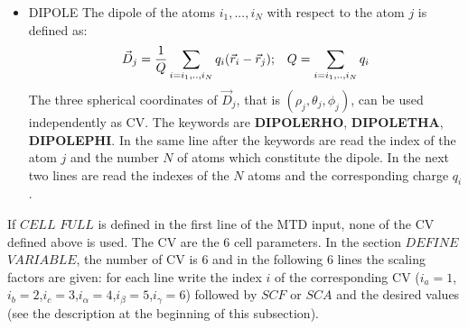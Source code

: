 \documentclass[twoside,10pt,titlepage,a4paper]{article}
\begin{document}
\begin{itemize}
\item{DIPOLE}
The dipole of the atoms $i_1,...,i_N$ with respect to the atom $j$ is defined as:
\begin{eqnarray}
\vec D_j={1\over Q}\sum_{i=i_1,..,i_N}q_i(\vec r_i -\vec r_j);\;\;\; Q=\sum_{i=i_1,..,i_N} q_i
\end{eqnarray}
The three spherical coordinates of $\vec D_j $, that is $(\rho_j,\theta_j,\phi_j)$, can be used
independently as CV. The keywords are {\bf DIPOLERHO}, {\bf DIPOLETHA}, {\bf DIPOLEPHI}. In the same
line after the keywords are read the index of the atom $j$ and the number $N$ of atoms which
constitute the dipole.  In the next two lines are read the indexes of the $N$ atoms and the
corresponding charge $q_i$.    
\end{itemize}

If $CELL $ $FULL$ is defined in the first line of the MTD input, none of the CV defined above is used.
The CV are the 6 cell parameters. In the section $DEFINE $ $VARIABLE$,
the number of CV is 6 and in the following 6 lines the scaling factors are given:
for each line write the index $i$ of the corresponding CV
($i_a=1$,$i_b=2$,$i_c=3$,$i_{\alpha}=4$,$i_{\beta}=5$,$i_{\gamma}=6$)
followed by $SCF$ or $SCA$ and the desired values
(see the description at the beginning of this subsection).
\end{document}

